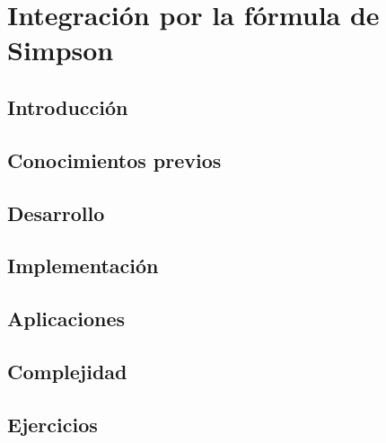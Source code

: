 \chapter{Integración por la fórmula de Simpson}
\section{Introducción}

\section{Conocimientos previos}

\section{Desarrollo}

\section{Implementación}

\section{Aplicaciones}

\section{Complejidad}

\section{Ejercicios}
